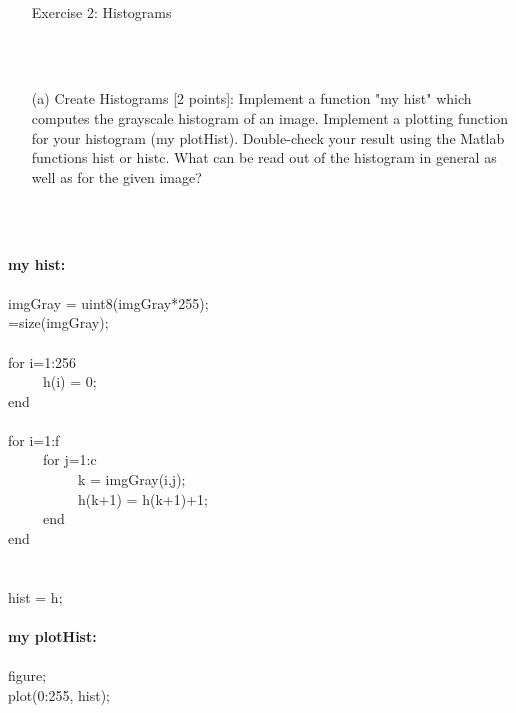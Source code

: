         \\ \pagebreak
    \begin{enumerate}
         \item[Exercise 2:] Histograms
    \end{enumerate}
    \\\\
    \begin{enumerate}        
        \item[(a)] {Create Histograms [2 points]: Implement a function "my hist" which computes the grayscale histogram of an image. Implement a plotting function for your histogram (my plotHist).
            Double-check your result using the Matlab functions hist or histc. What can be read out of the histogram  in general as well as for the given image?}
    \end{enumerate}
    \\\\
    \raggedright{
    \textbf{my hist:}
    \\ \ \\
    imgGray = uint8(imgGray*255);
    \\ [f,c]=size(imgGray);
    \\
    \\ for i=1:256
    \\ \ \ \ \ \ h(i) = 0;
    \\ end
    \\
    \\ for i=1:f
       \\ \ \ \ \ \ for j=1:c
           \\ \ \ \ \ \ \ \ \ \ \ k = imgGray(i,j);
           \\ \ \ \ \ \ \ \ \ \ \ h(k+1) = h(k+1)+1;
       \\ \ \ \ \ \ end
    \\ end
    \\ \ \\
    \\ hist = h;}
    \\ \ \\
    \textbf{my plotHist:}
    \\ \ \\
    figure;
    \\ plot(0:255, hist);
    \\\\
